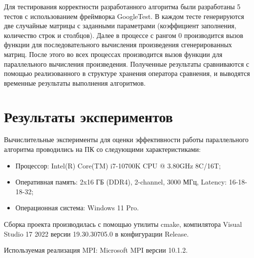 \documentclass{report}
\begin{document}
\par Для тестирования корректности разработанного алгоритма были разработаны 5 тестов с использованием фреймворка GoogleTest. В каждом тесте генерируются две случайные матрицы с заданными параметрами (коэффициент заполнения, количество строк и столбцов). Далее в процессе с рангом 0 производится вызов функции для последовательного вычисления произведения сгенерированных матриц. После этого во всех процессах производится вызов функции для параллельного вычисления произведения. Полученные результаты сравниваются с помощью реализованного в структуре хранения оператора сравнения, и выводятся временные результаты выполнения алгоритмов.

\clearpage

\section*{Результаты экспериментов}

\par Вычислительные эксперименты для оценки эффективности работы параллельного алгоритма проводились на ПК со следующими характеристиками:
\begin{itemize}
\item Процессор: Intel(R) Core(TM) i7-10700K CPU @ 3.80GHz 8C/16T;
\item Оперативная память: 2x16 ГБ (DDR4), 2-channel, 3000 МГц, Latency: 16-18-18-32;
\item Операционная система: Windows 11 Pro.
\end{itemize}
\par Сборка проекта производилась с помощью утилиты cmake, компилятора Visual Studio 17 2022 версии 19.30.30705.0 в конфигурации Release.
\par Используемая реализация MPI: Microsoft MPI версии 10.1.2.
\end{document}
